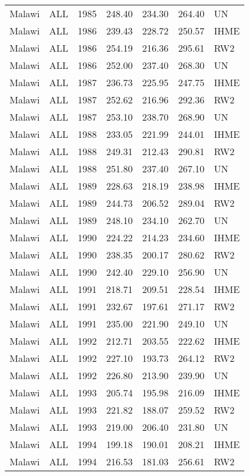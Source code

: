 \begin{longtable}{lllrrrl}
  Malawi & ALL & 1985 & 248.40 & 234.30 & 264.40 & UN \\ 
  Malawi & ALL & 1986 & 239.43 & 228.72 & 250.57 & IHME \\ 
  Malawi & ALL & 1986 & 254.19 & 216.36 & 295.61 & RW2 \\ 
  Malawi & ALL & 1986 & 252.00 & 237.40 & 268.30 & UN \\ 
  Malawi & ALL & 1987 & 236.73 & 225.95 & 247.75 & IHME \\ 
  Malawi & ALL & 1987 & 252.62 & 216.96 & 292.36 & RW2 \\ 
  Malawi & ALL & 1987 & 253.10 & 238.70 & 268.90 & UN \\ 
  Malawi & ALL & 1988 & 233.05 & 221.99 & 244.01 & IHME \\ 
  Malawi & ALL & 1988 & 249.31 & 212.43 & 290.81 & RW2 \\ 
  Malawi & ALL & 1988 & 251.80 & 237.40 & 267.10 & UN \\ 
  Malawi & ALL & 1989 & 228.63 & 218.19 & 238.98 & IHME \\ 
  Malawi & ALL & 1989 & 244.73 & 206.52 & 289.04 & RW2 \\ 
  Malawi & ALL & 1989 & 248.10 & 234.10 & 262.70 & UN \\ 
  Malawi & ALL & 1990 & 224.22 & 214.23 & 234.60 & IHME \\ 
  Malawi & ALL & 1990 & 238.35 & 200.17 & 280.62 & RW2 \\ 
  Malawi & ALL & 1990 & 242.40 & 229.10 & 256.90 & UN \\ 
  Malawi & ALL & 1991 & 218.71 & 209.51 & 228.54 & IHME \\ 
  Malawi & ALL & 1991 & 232.67 & 197.61 & 271.17 & RW2 \\ 
  Malawi & ALL & 1991 & 235.00 & 221.90 & 249.10 & UN \\ 
  Malawi & ALL & 1992 & 212.71 & 203.55 & 222.62 & IHME \\ 
  Malawi & ALL & 1992 & 227.10 & 193.73 & 264.12 & RW2 \\ 
  Malawi & ALL & 1992 & 226.80 & 213.90 & 239.90 & UN \\ 
  Malawi & ALL & 1993 & 205.74 & 195.98 & 216.09 & IHME \\ 
  Malawi & ALL & 1993 & 221.82 & 188.07 & 259.52 & RW2 \\ 
  Malawi & ALL & 1993 & 219.00 & 206.40 & 231.80 & UN \\ 
  Malawi & ALL & 1994 & 199.18 & 190.01 & 208.21 & IHME \\ 
  Malawi & ALL & 1994 & 216.53 & 181.03 & 256.61 & RW2 \\ 

\end{longtable}
